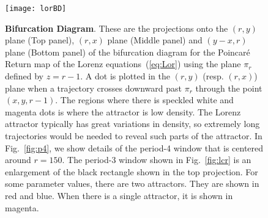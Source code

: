 \begin{figure}
 \centering
 \texttt{[image: lorBD]}
 \caption{{\bf Bifurcation Diagram}. 
    These are the projections onto the $(r,y)$ plane (Top panel), $(r,x)$ plane (Middle panel) and $(y-x,r)$ plane (Bottom panel) of the bifurcation diagram for the Poincar\'e Return map of the Lorenz equations~(\ref{eq:Lor}) using the plane $\pi_r$ defined by $z=r-1$. 
    A dot is plotted in the $(r,y)$ (resp. $(r,x)$) plane when a trajectory crosses downward past $\pi_r$ through the point $(x,y,r-1)$. 
    The regions where there is speckled white and magenta dots is where the attractor is low density. 
    The Lorenz attractor typically has great variations in density, so extremely long trajectories would be needed to reveal such parts of the attractor. 
    In Fig.~\ref{fig:p4}, we show details of the period-4 window that is centered around $r=150$. 
    The period-3 window shown in Fig.~\ref{fig:lcr} is an enlargement of the black rectangle shown in the top projection.
    For some parameter values, there are two attractors.
    They are shown in red and blue.
    When there is a single attractor, it is shown in magenta.
    }
 \label{fig:lfull}
\end{figure} 